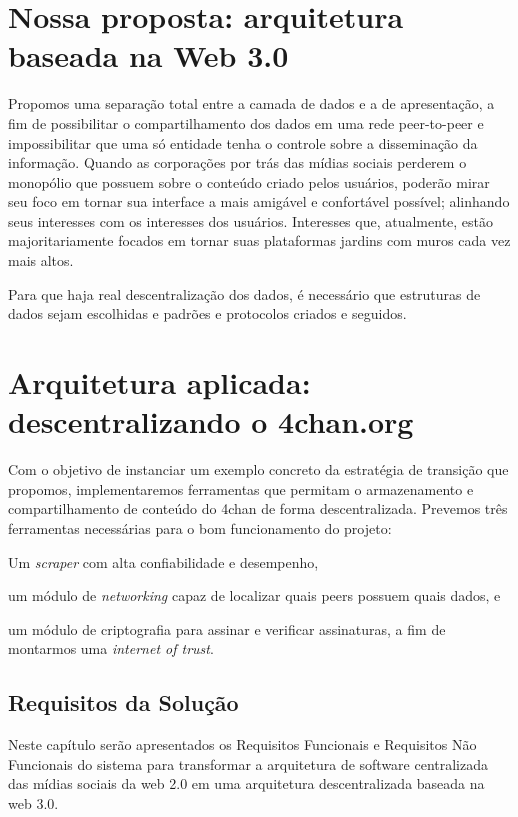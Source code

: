 \chapter{Nossa proposta: arquitetura baseada na Web 3.0}

Propomos uma separação total entre a camada de dados e a de apresentação, a fim de possibilitar o compartilhamento dos dados em uma rede peer-to-peer e impossibilitar que uma só entidade tenha o controle sobre a disseminação da informação.
Quando as corporações por trás das mídias sociais perderem o monopólio que possuem sobre o conteúdo criado pelos usuários, poderão mirar seu foco em tornar sua interface a mais amigável e confortável possível; alinhando seus interesses com os interesses dos usuários.
Interesses que, atualmente, estão majoritariamente focados em tornar suas plataformas jardins com muros cada vez mais altos.



Para que haja real descentralização dos dados, é necessário que estruturas de dados sejam escolhidas e padrões e protocolos criados e seguidos.

\chapter{Arquitetura aplicada: descentralizando o 4chan.org}

Com o objetivo de instanciar um exemplo concreto da estratégia de transição que propomos, implementaremos ferramentas que permitam o armazenamento e compartilhamento de conteúdo do 4chan de forma descentralizada.
Prevemos três ferramentas necessárias para o bom funcionamento do projeto:
\begin{enumerate*}[label=(\arabic*)]
    \item Um \textit{scraper} com alta confiabilidade e desempenho,
    \item um módulo de \textit{networking} capaz de localizar quais peers possuem quais dados, e
    \item um módulo de criptografia para assinar e verificar assinaturas, a fim de montarmos uma \textit{internet of trust}. 
\end{enumerate*}

\section{Requisitos da Solução}

Neste capítulo serão apresentados os Requisitos Funcionais e Requisitos Não Funcionais do sistema para transformar a arquitetura de software centralizada das mídias sociais da web 2.0 em uma arquitetura descentralizada baseada na web 3.0.

